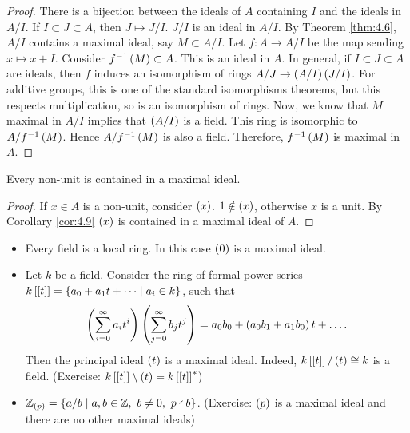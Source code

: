 \begin{proof}
There is a bijection between the ideals of $ A $ containing $ I $ and the ideals in $ A / I $. If $ I \subset J \subset A $, then $ J \mapsto J / I $. $ J / I $ is an ideal in $ A / I $. By Theorem \ref{thm:4.6}, $ A / I $ contains a maximal ideal, say $ M \subset A / I $. Let $ f : A \to A / I $ be the map sending $ x \mapsto x + I $. Consider $ f^{-1}\left( M \right) \subset A $. This is an ideal in $ A $. In general, if $ I \subset J \subset A $ are ideals, then $ f $ induces an isomorphism of rings $ A / J \to \left( A / I \right)\left( J / I \right) $. For additive groups, this is one of the standard isomorphisms theorems, but this respects multiplication, so is an isomorphism of rings. Now, we know that $ M $ maximal in $ A / I $ implies that $ \left( A / I \right) $ is a field. This ring is isomorphic to $ A / f^{-1}\left( M \right) $. Hence $ A / f^{-1}\left( M \right) $ is also a field. Therefore, $ f^{-1}\left( M \right) $ is maximal in $ A $.
\end{proof}

\begin{corollary}
\label{cor:4.10}
Every non-unit is contained in a maximal ideal.
\end{corollary}

\begin{proof}
If $ x \in A $ is a non-unit, consider $ \left( x \right) $. $ 1 \notin \left( x \right) $, otherwise $ x $ is a unit. By Corollary \ref{cor:4.9} $ \left( x \right) $ is contained in a maximal ideal of $ A $.
\end{proof}

\begin{example*}
\hfill
\begin{itemize}
\item Every field is a local ring. In this case $ \left( 0 \right) $ is a maximal ideal.
\item Let $ k $ be a field. Consider the ring of formal power series $ k\left[ \left[ t \right] \right] = \left\{ a_0 + a_1t + \dots \mid a_i \in k \right\} $, such that
$$ \left( \sum_{i = 0}^\infty a_it^i \right)\left( \sum_{j = 0}^\infty b_jt^j \right) = a_0b_0 + \left( a_0b_1 + a_1b_0 \right)t + \dots. $$
Then the principal ideal $ \left( t \right) $ is a maximal ideal. Indeed, $ k\left[ \left[ t \right] \right] / \left( t \right) \cong k $ is a field. (Exercise: $ k\left[ \left[ t \right] \right] \setminus \left( t \right) = k\left[ \left[ t \right] \right]^* $)
\item $ \mathbb{Z}_{\left( p \right)} = \left\{ a / b \mid a, b \in \mathbb{Z}, \ b \ne 0, \ p \nmid b \right\} $. (Exercise: $ \left( p \right) $ is a maximal ideal and there are no other maximal ideals)
\end{itemize}
\end{example*}

